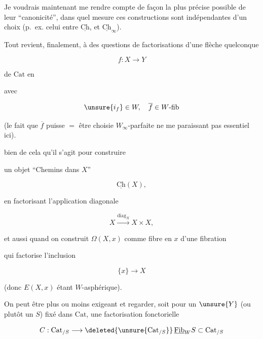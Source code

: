 Je voudrais maintenant me rendre compte de façon la plus précise possible  de leur ``canonicité'', dans quel mesure ces constructions sont indépendantes d'un choix (p.~ex. celui entre   $\underline{\mathrm{Ch}}$, et $\underline{\mathrm{Ch}}_\infty$).

Tout revient, finalement, à des questions de factorisations d'une flèche quelconque

\[
f:X\longrightarrow Y
\]

de $\mathrm{Cat}$ en


avec

\[
\unsure{i_f}\in W,\quad \overline f\in W\text{-}\mathrm{fib}
\]

(le fait que $\overline f$ puisse $=$ être choisie $W_\infty$-parfaite ne me paraissant pas essentiel ici).

 bien de cela qu'il s'agit pour construire

un objet ``Chemins dans $X$''

\[
\underline{\mathrm{Ch}}(X),
\]

en factorisant l'application diagonale

\[
X\xrightarrow{\mathrm{diag}_X}X\times X,
\]

et aussi quand on construit $\Omega(X,x)$ comme fibre en $x$ d'une fibration


qui factorise l'inclusion

\[
\{x\}\longrightarrow X
\]

(donc $E(X,x)$ étant $W$-asphérique).

On peut être plus ou moins exigeant et regarder, soit pour un  $\unsure{Y}$ (ou plutôt un $S$) fixé dans $\mathrm{Cat}$, une factorisation fonctorielle

\[
C:\mathrm{Cat}_{/S}\longrightarrow\deleted{\unsure{\mathrm{Cat}_{/S}}}\,\underline{\mathrm{Fib}}_W S\subset\mathrm{Cat}_{/S}
\]

